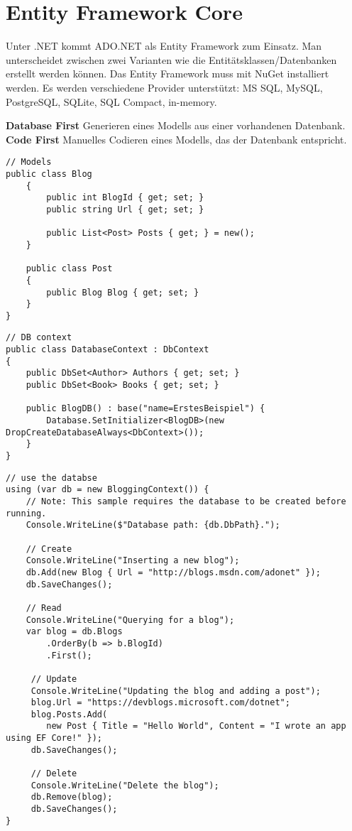 
\section{Entity Framework Core}
Unter .NET kommt ADO.NET als Entity Framework zum Einsatz. Man unterscheidet zwischen zwei Varianten wie die Entitätsklassen/Datenbanken erstellt werden können. Das Entity Framework muss mit NuGet installiert werden.
Es werden verschiedene Provider unterstützt: MS SQL, MySQL, PostgreSQL, SQLite, SQL Compact, in-memory.

\textbf{Database First} Generieren eines Modells aus einer vorhandenen Datenbank. \\
\textbf{Code First} Manuelles Codieren eines Modells, das der Datenbank entspricht.

\begin{lstlisting}
// Models
public class Blog
    {
        public int BlogId { get; set; }
        public string Url { get; set; }

        public List<Post> Posts { get; } = new();
    }

    public class Post
    {
        public Blog Blog { get; set; }
    }
}
\end{lstlisting}

\begin{lstlisting}
// DB context
public class DatabaseContext : DbContext
{
    public DbSet<Author> Authors { get; set; }
    public DbSet<Book> Books { get; set; }

	public BlogDB() : base("name=ErstesBeispiel") {
		Database.SetInitializer<BlogDB>(new DropCreateDatabaseAlways<DbContext>());
	}
}	
\end{lstlisting}

\begin{lstlisting}
// use the databse
using (var db = new BloggingContext()) {
	// Note: This sample requires the database to be created before running.
    Console.WriteLine($"Database path: {db.DbPath}.");
                
    // Create
    Console.WriteLine("Inserting a new blog");
    db.Add(new Blog { Url = "http://blogs.msdn.com/adonet" });
    db.SaveChanges();

    // Read
    Console.WriteLine("Querying for a blog");
    var blog = db.Blogs
    	.OrderBy(b => b.BlogId)
        .First();

     // Update
     Console.WriteLine("Updating the blog and adding a post");
     blog.Url = "https://devblogs.microsoft.com/dotnet";
     blog.Posts.Add(
     	new Post { Title = "Hello World", Content = "I wrote an app using EF Core!" });
     db.SaveChanges();

     // Delete
     Console.WriteLine("Delete the blog");
     db.Remove(blog);
     db.SaveChanges();
}
\end{lstlisting}


